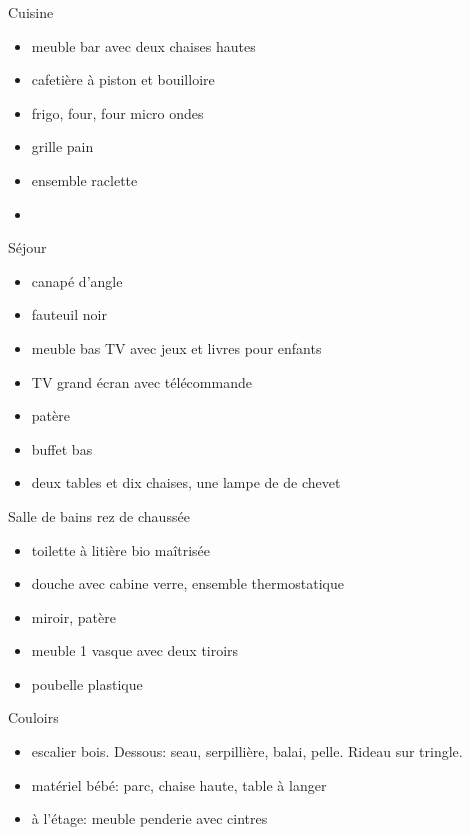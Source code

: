 \documentclass[a4paper,11pt]{article}
\begin{document}
\vspace{0.25cm}

Cuisine
\begin{itemize}
\item meuble bar avec deux chaises hautes 
\item cafetière à piston et bouilloire
\item frigo, four, four micro ondes
\item grille pain
\item ensemble raclette
\item 
\end{itemize}

\vspace{0.25cm}

Séjour
\begin{itemize}
\item canapé d'angle
\item fauteuil noir
\item meuble bas TV avec jeux et livres pour enfants
\item TV grand écran avec télécommande
\item patère
\item buffet bas 
\item deux tables et dix chaises, une lampe de de chevet
\end{itemize}

\vspace{0.25cm}

Salle de bains rez de chaussée
\begin{itemize}
\item toilette à litière bio maîtrisée
\item douche avec cabine verre, ensemble thermostatique
\item miroir, patère
\item meuble 1 vasque avec deux tiroirs
\item poubelle plastique
\end{itemize}

\vspace{0.25cm}
Couloirs
\begin{itemize}
\item escalier bois. Dessous: seau, serpillière, balai, pelle. Rideau sur tringle.
\item matériel bébé: parc, chaise haute, table à langer
\item à l'étage: meuble penderie avec cintres
\end{itemize}
\end{document}
